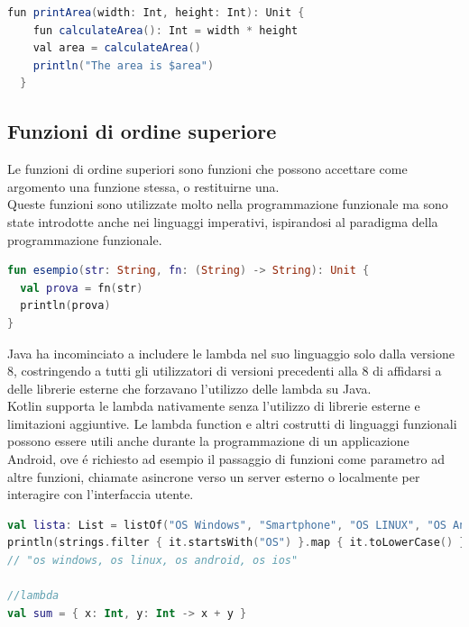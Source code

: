\begin{lstlisting}[language=java,caption={Esempio Funzioni locali}]
  fun printArea(width: Int, height: Int): Unit {
    fun calculateArea(): Int = width * height
    val area = calculateArea()
    println("The area is $area")
  }
\end{lstlisting}

\subsection{Funzioni di ordine superiore }
Le funzioni di ordine superiori sono funzioni che possono accettare come argomento una funzione stessa, o restituirne una.\\
Queste funzioni sono utilizzate molto nella programmazione funzionale ma sono state introdotte anche nei linguaggi imperativi, ispirandosi al paradigma della programmazione funzionale. \\

\begin{lstlisting}[language=kotlin,caption={Funzioni ordine superiore}]
fun esempio(str: String, fn: (String) -> String): Unit {
  val prova = fn(str)
  println(prova)
}
\end{lstlisting}

Java ha incominciato a includere le lambda nel suo linguaggio solo dalla versione 8, costringendo a tutti gli utilizzatori di versioni precedenti alla 8 di affidarsi a delle librerie esterne che forzavano l'utilizzo delle lambda su Java. \\
Kotlin  supporta le lambda nativamente senza l'utilizzo di librerie esterne e limitazioni aggiuntive.
Le lambda function e altri costrutti di linguaggi funzionali possono essere utili anche durante la programmazione di un applicazione Android, ove \'e richiesto ad esempio il passaggio di funzioni come parametro ad altre funzioni, chiamate asincrone verso un server esterno o localmente per interagire con l'interfaccia utente.

\begin{lstlisting}[language=kotlin,caption={Esempio Kotlin Programmazione funzionale}]
val lista: List = listOf("OS Windows", "Smartphone", "OS LINUX", "OS Android", "RAM", "OS IOS", "Scarpe")
println(strings.filter { it.startsWith("OS") }.map { it.toLowerCase() }.joinToString())
// "os windows, os linux, os android, os ios"

//lambda
val sum = { x: Int, y: Int -> x + y }
\end{lstlisting}




